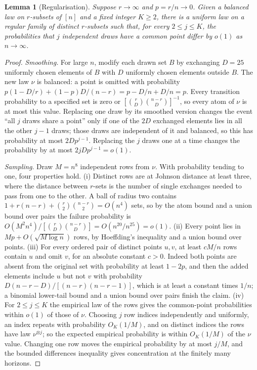 \documentclass[11pt,a4paper]{article}
\newtheorem{lemma}[theorem]{Lemma}
\theoremstyle{remark}
\begin{document}
\begin{lemma}[Regularisation]\label{lem:regularisation}
Suppose $r\to\infty$ and $p=r/n\to0$. Given a balanced law on $r$-subsets of $[n]$ and a fixed integer $K\ge2$, there is a uniform law on a regular family of distinct $r$-subsets such that, for every $2\le j\le K$, the probabilities that $j$ independent draws have a common point differ by $o(1)$ as $n\to\infty$.
\end{lemma}

\begin{proof}
\emph{Smoothing.} For large $n$, modify each drawn set $B$ by exchanging $D=25$ uniformly chosen elements of $B$ with $D$ uniformly chosen elements outside $B$. The new law $\nu$ is balanced: a point is omitted with probability $p(1-D/r)+(1-p)D/(n-r)=p-D/n+D/n=p$. Every transition probability to a specified set is zero or $[\binom rD\binom{n-r}D]^{-1}$, so every atom of $\nu$ is at most this value. Replacing one draw by its smoothed version changes the event ``all $j$ draws share a point'' only if one of the $2D$ exchanged elements lies in all the other $j-1$ draws; those draws are independent of it and balanced, so this has probability at most $2Dp^{j-1}$. Replacing the $j$ draws one at a time changes the probability by at most $2jDp^{j-1}=o(1)$.

\emph{Sampling.} Draw $M=n^8$ independent rows from $\nu$. With probability tending to one, four properties hold.
(i) Distinct rows are at Johnson distance at least three, where the distance between $r$-sets is the number of single exchanges needed to pass from one to the other. A ball of radius two contains $1+r(n-r)+\binom r2\binom{n-r}2=O(n^4)$ sets, so by the atom bound and a union bound over pairs the failure probability is $O(M^2n^4)/[\binom rD\binom{n-r}D]=O(n^{20}/n^{25})=o(1)$.
(ii) Every point lies in $Mp+O(\sqrt{M\log n})$ rows, by Hoeffding's inequality and a union bound over points.
(iii) For every ordered pair of distinct points $u,v$, at least $cM/n$ rows contain $u$ and omit $v$, for an absolute constant $c>0$. Indeed both points are absent from the original set with probability at least $1-2p$, and then the added elements include $u$ but not $v$ with probability $D(n-r-D)/[(n-r)(n-r-1)]$, which is at least a constant times $1/n$; a binomial lower-tail bound and a union bound over pairs finish the claim.
(iv) For $2\le j\le K$ the empirical law of the rows gives the common-point probabilities within $o(1)$ of those of $\nu$. Choosing $j$ row indices independently and uniformly, an index repeats with probability $O_K(1/M)$, and on distinct indices the rows have law $\nu^{\otimes j}$; so the expected empirical probability is within $O_K(1/M)$ of the $\nu$ value. Changing one row moves the empirical probability by at most $j/M$, and the bounded differences inequality gives concentration at the finitely many horizons.


\end{proof}
\end{document}
